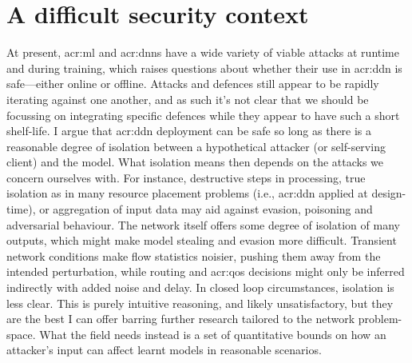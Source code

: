 
\section{A difficult security context}
At present, \gls{acr:ml} and \glspl{acr:dnn} have a wide variety of viable attacks at runtime and during training, which raises questions about whether their use in \gls{acr:ddn} is safe---either online or offline.
Attacks and defences still appear to be rapidly iterating against one another, and as such it's not clear that we should be focussing on integrating specific defences while they appear to have such a short shelf-life.
I argue that \gls{acr:ddn} deployment can be safe so long as there is a reasonable degree of isolation between a hypothetical attacker (or self-serving client) and the model.
What isolation means then depends on the attacks we concern ourselves with.
For instance, destructive steps in processing, true isolation as in many resource placement problems (i.e., \gls{acr:ddn} applied at design-time), or aggregation of input data may aid against evasion, poisoning and adversarial behaviour.
The network itself offers some degree of isolation of many outputs, which might make model stealing and evasion more difficult.
Transient network conditions make flow statistics noisier, pushing them away from the intended perturbation, while routing and \gls{acr:qos} decisions might only be inferred indirectly with added noise and delay.
In closed loop circumstances, isolation is less clear.
This is purely intuitive reasoning, and likely unsatisfactory, but they are the best I can offer barring further research tailored to the network problem-space.
What the field needs instead is a set of quantitative bounds on how an attacker's input can affect learnt models in reasonable scenarios.

%
%

